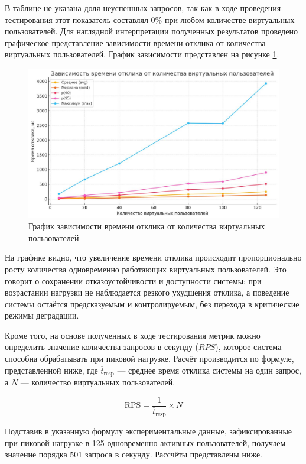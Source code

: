 	В таблице не указана доля неуспешных запросов, так как в ходе проведения тестирования этот показатель составлял 0\% при любом количестве виртуальных пользователей. Для наглядной интерпретации полученных результатов проведено графическое представление зависимости времени отклика от количества виртуальных пользователей. График зависимости представлен на рисунке \ref{fig:load_testing_graphic}.

	\begin{figure}[ht!] 
		\center
		\includegraphics [scale=0.37] {my_folder/images//load_testing_graphic}
		\caption{График зависимости времени отклика от количества виртуальных пользователей} 
		\label{fig:load_testing_graphic}  
	\end{figure}

	На графике видно, что увеличение времени отклика происходит пропорционально росту количества одновременно работающих виртуальных пользователей. Это говорит о сохранении отказоустойчивости и доступности системы: при возрастании нагрузки не наблюдается резкого ухудшения отклика, а поведение системы остаётся предсказуемым и контролируемым, без перехода в критические режимы деградации.

	Кроме того, на основе полученных в ходе тестирования метрик можно определить значение количества запросов в секунду ($RPS$), которое система способна обрабатывать при пиковой нагрузке. Расчёт производится по формуле, представленной ниже, где $\overline{t}_{\text{resp}}$ — среднее время отклика системы на один запрос, а $N$ — количество виртуальных пользователей.

	\[
	\text{RPS} = \frac{1}{\overline{t}_{\text{resp}}} \times N
	\]

	Подставив в указанную формулу экспериментальные данные, зафиксированные при пиковой нагрузке в 125 одновременно активных пользователей, получаем значение порядка 501 запроса в секунду. Рассчёты представлены ниже.
	
